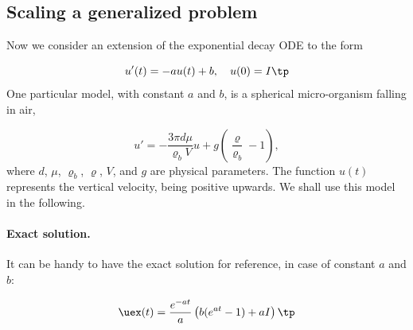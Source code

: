\documentclass[graybox,envcountchap,sectrefs,final]{svmonodo}
\begin{document}
\subsection{Scaling a generalized problem}
\label{sec:scale:decay:body}

Now we consider an extension of the exponential decay ODE to the
form

\begin{equation}
u'(t) = -au(t) + b,\quad u(0)=I
\label{scale:decay:model:g}
\tp
\end{equation}
One particular model, with constant $a$ and $b$,
is a spherical micro-organism falling in air,

\begin{equation}
u' = - \frac{3\pi d\mu}{\varrho_b V} u + g\left(\frac{\varrho}{\varrho_b} -1\right),
\label{scale:decay:model:g:spec}
\end{equation}
where $d$, $\mu$, $\varrho_b$, $\varrho$, $V$, and $g$ are physical
parameters. The function $u(t)$ represents the vertical velocity,
being positive upwards.
We shall use this model in the following.

\paragraph{Exact solution.}
It can be handy to have the exact solution for reference, in case
of constant $a$ and $b$:

\[ \uex(t) = \frac{e^{-at}}{a}\left( b(e^{at}-1) + aI\right)
\tp
\]
\end{document}
